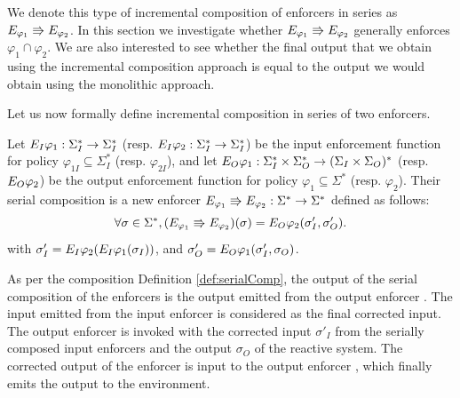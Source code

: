 {\begin{SingleColFigure}
	\label{fig:serialComp1}
\end{SingleColFigure}

We denote this type of incremental composition of enforcers in series as  $E_{{\varphi_1}} \Rrightarrow E_{{\varphi_2}}$.
In this section we investigate whether $E_{{\varphi_1}} \Rrightarrow E_{{\varphi_2}}$
generally enforces $\varphi_1\cap\varphi_2$.
We are also interested to see whether the final output that we obtain using the incremental composition approach is equal to the output we would obtain using the monolithic approach.

Let us now formally define incremental composition in series of two enforcers.

\begin{definition}
	\label{def:serialComp}
	Let $E_{I}{\varphi_1}: \Sigma_I^* \rightarrow \Sigma_I^*$ (resp. $E_{I}{\varphi_2}: \Sigma_I^* \rightarrow \Sigma_I^*$) be the input enforcement function for policy $\varphi_{1I}  \subseteq \Sigma_I^*$ (resp. $\varphi_{2I}$), and 
	let 
	$E_{O}{\varphi_1}: \Sigma_I^* \times \Sigma_O^* \rightarrow (\Sigma_I \times \Sigma_O)^*$ (resp. $E_{O}{\varphi_2}$) be the output enforcement function for policy $\varphi_1  \subseteq \Sigma^*$ (resp. $\varphi_2$). 
	Their serial composition is a new enforcer $E_{{\varphi_1}} \Rrightarrow E_{{\varphi_2}}: \Sigma^* \rightarrow \Sigma^*$ defined as follows:
	\[
	\forall \sigma\in\Sigma^*,
	(E_{{\varphi_1}} \Rrightarrow E_{{\varphi_2}})(\sigma)
	= E_{O}{\varphi_2}(\sigma'_I, \sigma'_O).
	\]
	with $\sigma'_I = E_{I}{\varphi_2}(E_{I}{\varphi_1}({\sigma_I}))$, and $\sigma'_O = E_{O}{\varphi_1}(\sigma'_I, \sigma_O)$.
\end{definition}
As per the composition Definition \ref{def:serialComp}, the output of the serial composition of the enforcers is the output emitted from the output enforcer . The input emitted from the input enforcer  is considered as the final corrected input. The output enforcer  is invoked with the corrected input $\sigma'_I$ from the serially composed input enforcers and the output $\sigma_O$ of the reactive system. The corrected output of the enforcer is input to the output enforcer , which finally emits the output to the environment.   

}
